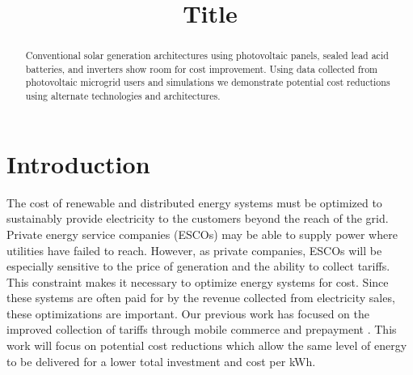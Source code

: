 \documentclass[conference]{IEEEtran}
\title{Title}
\begin{document}


\maketitle

\begin{abstract}
Conventional solar generation architectures using photovoltaic
panels, sealed lead acid batteries, and inverters show room for
cost improvement.
Using data collected from photovoltaic microgrid users and simulations
we demonstrate potential cost reductions using alternate 
technologies and architectures.
\end{abstract}

\section{Introduction}

The cost of renewable and distributed energy systems must be
optimized to sustainably provide electricity to the customers 
beyond the reach of the grid.
Private energy service companies (ESCOs) may be able to supply power
where utilities have failed to reach.
However, as private companies, ESCOs will be especially sensitive
to the price of generation and the ability to collect
tariffs.
This constraint makes it necessary to optimize energy systems
for cost.
Since these systems are often paid for by the revenue collected
from electricity sales, these optimizations are important.
\cite{fee for service literature}
Our previous work has focused on the improved collection of 
tariffs through mobile commerce and prepayment \cite{ICTD}.
This work will focus on potential cost reductions which allow
the same level of energy to be delivered for a lower total
investment and cost per kWh.
\end{document}
